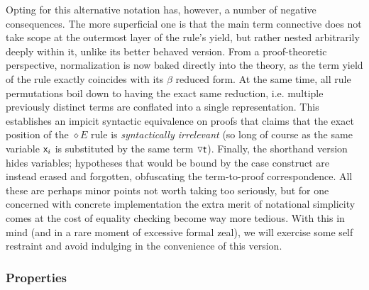 Opting for this alternative notation has, however, a number of negative consequences.
The more superficial one is that the main term connective does not take scope at the outermost layer of the rule's yield, but rather nested arbitrarily deeply within it, unlike its better behaved version.
From a proof-theoretic perspective, normalization is now baked directly into the theory, as the term yield of the rule exactly coincides with its $\beta$ reduced form.
At the same time, all rule permutations boil down to having the exact same reduction, i.e. multiple previously distinct terms are conflated into a single representation.
This establishes an impicit syntactic equivalence on proofs that claims that the exact position of the $\diamond E$ rule is \textit{syntactically irrelevant} (so long of course as the same variable $\mathsf{\mathsf{x}_{\mathnormal{i}} }$ is substituted by the same term $\smallterm{\diaelim t}$).
Finally, the shorthand version hides variables; hypotheses that would be bound by the case construct are instead erased and forgotten, obfuscating the term-to-proof correspondence.
All these are perhaps minor points not worth taking too seriously, but for one concerned with concrete implementation the extra merit of notational simplicity comes at the cost of equality checking become way more tedious.
With this in mind (and in a rare moment of excessive formal zeal), we will exercise some self restraint and avoid indulging in the convenience of this version.

\subsubsection{Properties}

